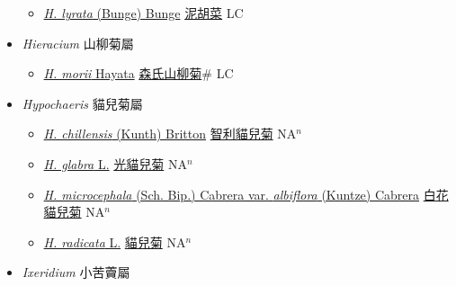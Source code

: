 \begin{itemize}
  \begin{itemize}
        \item[] \href{http://www.theplantlist.org/tpl1.1/search?q=Hemistepta+lyrata}{\textit{H. lyrata} (Bunge) Bunge}   \href{\detokenize{http://taibnet.sinica.edu.tw/chi/taibnet_species_list.php?T2=泥胡菜&T2_new_value=true&fr=y}}{泥胡菜} LC
  \end{itemize}
 \item[] \textit{Hieracium} 山柳菊屬
                    
  \begin{itemize}
        \item[] \href{http://www.theplantlist.org/tpl1.1/search?q=Hieracium+morii}{\textit{H. morii} Hayata}   \href{\detokenize{http://taibnet.sinica.edu.tw/chi/taibnet_species_list.php?T2=森氏山柳菊&T2_new_value=true&fr=y}}{森氏山柳菊}\# LC
  \end{itemize}
 \item[] \textit{Hypochaeris} 貓兒菊屬
                    
  \begin{itemize}
        \item[] \href{http://www.theplantlist.org/tpl1.1/search?q=Hypochaeris+chillensis}{\textit{H. chillensis} (Kunth) Britton}   \href{\detokenize{http://taibnet.sinica.edu.tw/chi/taibnet_species_list.php?T2=智利貓兒菊&T2_new_value=true&fr=y}}{智利貓兒菊} NA$^n$
        \item[] \href{http://www.theplantlist.org/tpl1.1/search?q=Hypochaeris+glabra}{\textit{H. glabra} L.}   \href{\detokenize{http://taibnet.sinica.edu.tw/chi/taibnet_species_list.php?T2=光貓兒菊&T2_new_value=true&fr=y}}{光貓兒菊} NA$^n$
        \item[] \href{http://www.theplantlist.org/tpl1.1/search?q=Hypochaeris+microcephala+var.+albiflora}{\textit{H. microcephala} (Sch. Bip.) Cabrera var. \textit{albiflora} (Kuntze) Cabrera}   \href{\detokenize{http://taibnet.sinica.edu.tw/chi/taibnet_species_list.php?T2=白花貓兒菊&T2_new_value=true&fr=y}}{白花貓兒菊} NA$^n$
        \item[] \href{http://www.theplantlist.org/tpl1.1/search?q=Hypochaeris+radicata}{\textit{H. radicata} L.}   \href{\detokenize{http://taibnet.sinica.edu.tw/chi/taibnet_species_list.php?T2=貓兒菊&T2_new_value=true&fr=y}}{貓兒菊} NA$^n$
  \end{itemize}
 \item[] \textit{Ixeridium} 小苦藚屬
                    

\end{itemize}
